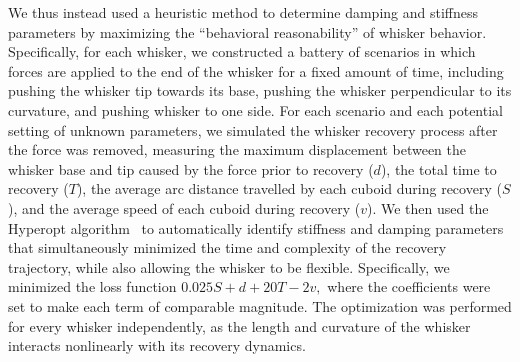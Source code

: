 We thus instead used a heuristic method to determine damping and stiffness parameters by maximizing the ``behavioral reasonability'' of whisker behavior. 
Specifically, for each whisker, we constructed a battery of scenarios in which forces are applied to the end of the whisker for a fixed amount of time, including pushing the whisker tip towards its base, pushing the whisker perpendicular to its curvature, and pushing whisker to one side.  
For each scenario and each potential setting of unknown parameters, we simulated the whisker recovery process after the force was removed, measuring the maximum displacement between the whisker base and tip caused by the force prior to recovery ($d$), the total time to recovery ($T$), the average arc distance travelled by each cuboid during recovery ($S$), and the average speed of each cuboid during recovery ($v$).    
We then used the Hyperopt algorithm~\cite{bergstra2013hyperopt} to automatically identify stiffness and damping parameters that simultaneously minimized the time and complexity of the recovery trajectory, while also allowing the whisker to be flexible.   
Specifically, we minimized the loss function $0.025S + d + 20T - 2v,$ where the coefficients were set to make each term of comparable magnitude.   
The optimization was performed for every whisker independently, as the length and curvature of the whisker interacts nonlinearly with its recovery dynamics.   



